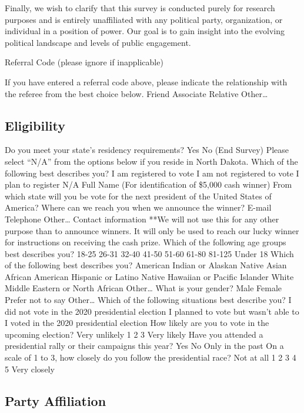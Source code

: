 \documentclass[
  letterpaper,
  DIV=11,
  numbers=noendperiod]{scrartcl}
\begin{document}
Finally, we wish to clarify that this survey is conducted purely for
research purposes and is entirely unaffiliated with any political party,
organization, or individual in a position of power. Our goal is to gain
insight into the evolving political landscape and levels of public
engagement.

Referral Code (please ignore if inapplicable)

If you have entered a referral code above, please indicate the
relationship with the referee from the best choice below. Friend
Associate Relative Other\ldots{}

\hypertarget{eligibility-1}{%
\subsection{Eligibility}\label{eligibility-1}}

Do you meet your state's residency requirements? Yes No (End Survey)
Please select ``N/A'' from the options below if you reside in North
Dakota. Which of the following best describes you? I am registered to
vote I am not registered to vote I plan to register N/A Full Name (For
identification of \$5,000 cash winner) From which state will you be vote
for the next president of the United States of America? Where can we
reach you when we announce the winner? E-mail Telephone Other\ldots{}
Contact information **We will not use this for any other purpose than to
announce winners. It will only be used to reach our lucky winner for
instructions on receiving the cash prize. Which of the following age
groups best describes you? 18-25 26-31 32-40 41-50 51-60 61-80 81-125
Under 18 Which of the following best describes you? American Indian or
Alaskan Native Asian African American Hispanic or Latino Native Hawaiian
or Pacific Islander White Middle Eastern or North African Other\ldots{}
What is your gender? Male Female Prefer not to say Other\ldots{} Which
of the following situations best describe you? I did not vote in the
2020 presidential election I planned to vote but wasn't able to I voted
in the 2020 presidential election How likely are you to vote in the
upcoming election? Very unlikely 1 2 3 Very likely Have you attended a
presidential rally or their campaigns this year? Yes No Only in the past
On a scale of 1 to 3, how closely do you follow the presidential race?
Not at all 1 2 3 4 5 Very closely

\hypertarget{party-affiliation-1}{%
\subsection{Party Affiliation}\label{party-affiliation-1}}
\end{document}
